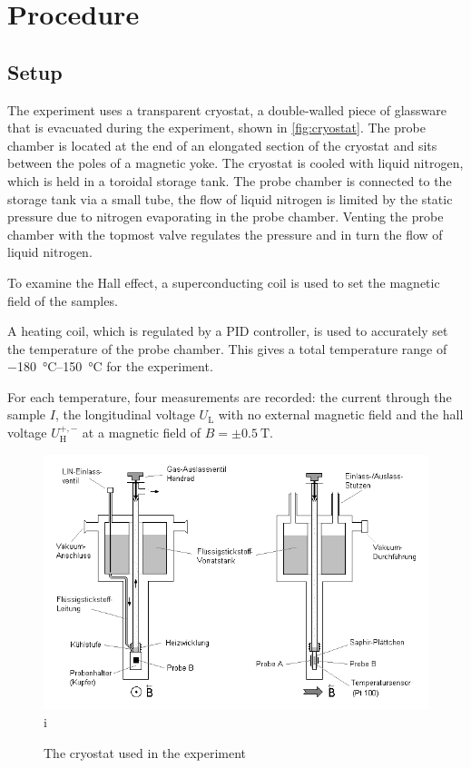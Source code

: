 \chapter{Procedure}
\section{Setup}
The experiment uses a transparent cryostat, a double-walled piece of glassware that is evacuated during the experiment, shown in \autoref{fig:cryostat}.
The probe chamber is located at the end of an elongated section of the cryostat and sits between the poles of a magnetic yoke.
The cryostat is cooled with liquid nitrogen, which is held in a toroidal storage tank.
The probe chamber is connected to the storage tank via a small tube, the flow of liquid nitrogen is limited by the static pressure due to nitrogen evaporating in the probe chamber.
Venting the probe chamber with the topmost valve regulates the pressure and in turn the flow of liquid nitrogen.

To examine the Hall effect, a superconducting coil is used to set the magnetic field of the samples.

A heating coil, which is regulated by a PID controller, is used to accurately set the temperature of the probe chamber.
This gives a total temperature range of \SIrange{-180}{150}{\celsius} for the experiment.

For each temperature, four measurements are recorded: the current through the sample $I$, the longitudinal voltage $U_\text{L}$ with no external magnetic field and the hall voltage $U_\text{H}^{+,-}$ at a magnetic field of $B = \pm \SI{0.5}{\tesla}$.

\begin{figure}
	\centering
	\includegraphics[width=.7\textwidth]{./img/cryostat.png}i
	\caption[Cryostat]{The cryostat used in the experiment}
	\label{fig:cryostat}
\end{figure}


